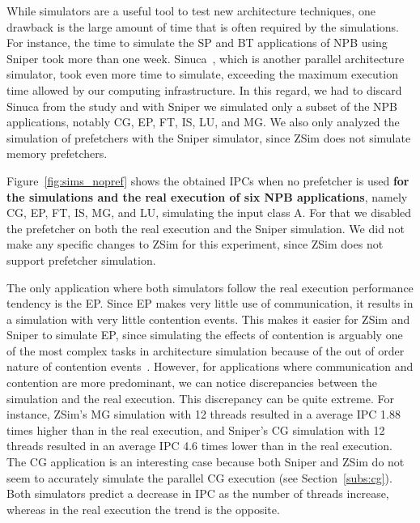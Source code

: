 \documentclass[AMA,final,STIX1COL]{WileyNJD-v2}
\newcommand\new[1]{{\color{red}\textbf{#1}}}
\begin{document}
While simulators are a useful tool to test new architecture techniques, one drawback is the large amount of time that is often required by the simulations. For instance, the time to simulate the SP and BT applications of NPB using Sniper took more than one week. Sinuca~\cite{alves2015sinuca}, which is another parallel architecture simulator, took even more time to simulate, exceeding the maximum execution time allowed by our computing infrastructure. In this regard, we had to discard Sinuca from the study and with Sniper we simulated only a subset of the NPB applications, notably CG, EP, FT, IS, LU, and MG. 
We also only analyzed the simulation of prefetchers with the Sniper simulator, since ZSim does not simulate memory prefetchers. 


Figure~\ref{fig:sims_nopref} shows the obtained IPCs when no prefetcher is used \new{for the simulations and the real execution of six NPB applications}, namely CG, EP, FT, IS, MG, and LU, simulating the input class A.
For that we disabled the prefetcher on both the real execution and the Sniper simulation. 
We did not make any specific changes to ZSim for this experiment, since ZSim does not support prefetcher simulation.



The only application where both simulators follow the real execution performance tendency is the EP. Since EP makes very little use of communication, it results in a simulation with very little contention events. 
This makes it easier for ZSim and Sniper to simulate EP, since simulating the effects of contention is arguably one of the most complex tasks in architecture simulation because of the out of order nature of contention events~\cite{sanchez2013zsim}.
However, for applications where communication and contention are more predominant, we can notice discrepancies between the simulation and the real execution. 
This discrepancy can be quite extreme. For instance, ZSim's MG simulation with 12 threads resulted in a average IPC 1.88 times higher than in the real execution, and Sniper's CG simulation with 12 threads resulted in an average IPC 4.6 times lower than in the real execution. 
The CG application is an interesting case because both Sniper and ZSim do not seem to accurately simulate the parallel CG execution (see Section~\ref{subs:cg}).
Both simulators predict a decrease in IPC as the number of threads increase, whereas in the real execution the trend is the opposite.
\end{document}
